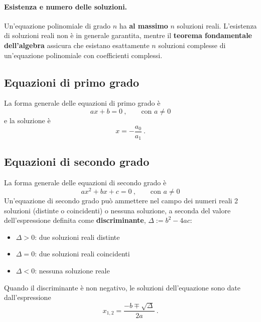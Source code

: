 \paragraph{Esistenza e numero delle soluzioni.} Un'equazione polinomiale di grado $n$ ha \textbf{al massimo} $n$ soluzioni reali. L'esistenza di soluzioni reali non è in generale garantita, mentre il \textbf{teorema fondamentale dell'algebra} assicura che esistano esattamente $n$ soluzioni complesse di un'equazione polinomiale con coefficienti complessi.

\subsection{Equazioni di primo grado}
La forma generale delle equazioni di primo grado è
\begin{equation}
    a x + b = 0 \ , \qquad \text{con $a \ne 0$}
\end{equation}
e la soluzione è
\begin{equation}
  x = -\dfrac{a_0}{a_1} \ .
\end{equation}
\subsection{Equazioni di secondo grado}
La forma generale delle equazioni di secondo grado è
\begin{equation}
    a x^2 + b x + c = 0 \ , \qquad \text{con $a \ne 0$}
\end{equation}
%
Un'equazione di secondo grado può ammettere nel campo dei numeri reali 2 soluzioni (distinte o coincidenti) o nessuna soluzione, a seconda del valore dell'espressione definita come \textbf{discriminante}, $\Delta := b^2 - 4 a c$:
\begin{itemize}
    \item $\Delta > 0$: due soluzioni reali distinte
    \item $\Delta = 0$: due soluzioni reali coincidenti
    \item $\Delta < 0$: nessuna soluzione reale
\end{itemize}
Quando il discriminante è non negativo, le soluzioni dell'equazione sono date dall'espressione
\begin{equation}
    x_{1,2} = \dfrac{-b \mp \sqrt{\Delta}}{2a} \ .
\end{equation}
%
